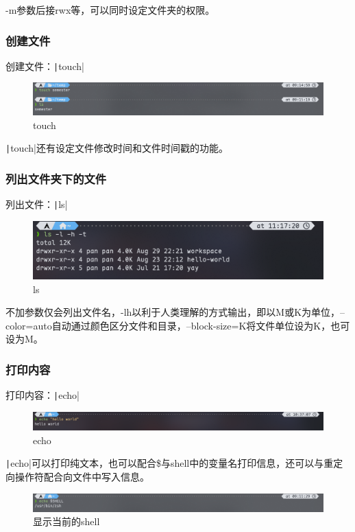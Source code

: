 \documentclass[fontset=ubuntu]{ctexart}
\begin{document}
\begin{sloppypar}
-m参数后接rwx等，可以同时设定文件夹的权限。

\subsubsection{创建文件}
创建文件：\texttt|touch|
\begin{figure}
    \centering
    \includegraphics[width=0.75\linewidth]{touch_1.png}
    \caption{touch}
    \label{fig:touch_1}
\end{figure}

\texttt|touch|还有设定文件修改时间和文件时间戳的功能。

\subsubsection{列出文件夹下的文件}
列出文件：\texttt|ls|
\begin{figure}[htb]
    \centering
    \includegraphics[width=0.75\linewidth]{ls_1.png}
    \caption{ls}
    \label{fig:ls_1}
\end{figure}

不加参数仅会列出文件名，-lh以利于人类理解的方式输出，即以M或K为单位，--color=auto自动通过颜色区分文件和目录，--block-size=K将文件单位设为K，也可设为M。

\subsubsection{打印内容}
打印内容：\texttt|echo|
\begin{figure}[htb]
    \centering
    \includegraphics[width=0.75\linewidth]{echo_1.png}
    \caption{echo}
    \label{fig:echo_1}
\end{figure}

\texttt|echo|可以打印纯文本，也可以配合\$与shell中的变量名打印信息，还可以与重定向操作符配合向文件中写入信息。
\begin{figure}[htb]
    \centering
    \includegraphics[width=0.75\linewidth]{shell_1.png}
    \caption{显示当前的shell}
    \label{fig:shell_1}
\end{figure}


\end{sloppypar}
\end{document}
